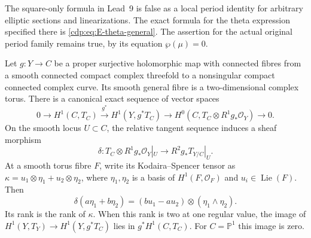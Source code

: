 \begin{proposition}\label{cdp:st:E18}

The square-only formula in Lead~9 is false as a local period
identity for arbitrary elliptic sections and linearizations.
The exact formula for the theta expression specified there is
\eqref{cdp:eq:E-theta-general}. The assertion for the actual original
period family remains true, by its equation $\wp(\mu)=0$.
\end{proposition}

\begin{proposition}\label{cdp:st:E5}

Let $g:Y\to C$ be a proper surjective holomorphic map with connected fibres
from a smooth connected compact complex threefold to a nonsingular compact
connected complex curve. Its smooth general fibre is a two-dimensional complex
torus. There is a canonical exact sequence of vector spaces
\begin{equation}\label{cdp:eq:E-Leray-map}
0\to H^1(C,T_C)\xrightarrow{g^*}H^1(Y,g^*T_C)
 \to H^0(C,T_C\otimes R^1g_*\mathcal O_Y)\to0.
\end{equation}
On the smooth locus $U\subset C$, the relative tangent sequence
induces a sheaf morphism
\[
 \delta:T_C\otimes R^1g_*\mathcal O_Y|_U
                  \longrightarrow R^2g_*T_{Y/C}|_U.
\]
At a smooth torus fibre $F$, write its Kodaira--Spencer tensor as
$\kappa=u_1\otimes\eta_1+u_2\otimes\eta_2$, where
$\eta_1,\eta_2$ is a basis of $H^1(F,\mathcal O_F)$ and
$u_i\in\operatorname{Lie}(F)$. Then
\[
 \delta(a\eta_1+b\eta_2)
   =(bu_1-au_2)\otimes(\eta_1\wedge\eta_2).
\]
Its rank is the rank of $\kappa$. When this rank is two at one
regular value, the image of $H^1(Y,T_Y)\to H^1(Y,g^*T_C)$ lies
in $g^*H^1(C,T_C)$. For $C=\mathbb P^1$ this image is zero.
\end{proposition}

